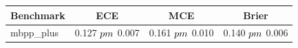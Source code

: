 \begin{tabular}{lccc}
\toprule
Benchmark & ECE & MCE & Brier \\
\midrule
mbpp_plus & 0.127 $\\pm$ 0.007 & 0.161 $\\pm$ 0.010 & 0.140 $\\pm$ 0.006 \\
\bottomrule
\end{tabular}
